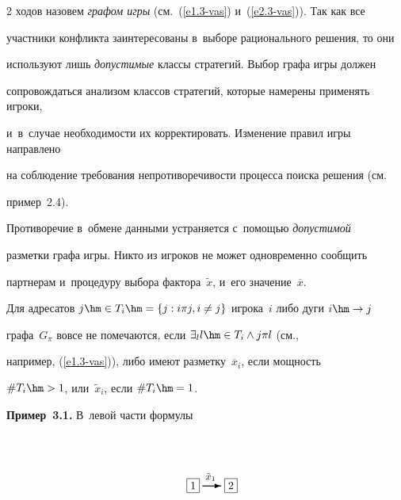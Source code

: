 \begin{multicols}{2}
ходов назовем \textit{графом игры} (см.~(\ref{e1.3-vas}) и~(\ref{e2.3-vas})). Так как все 

участники конфликта заинтересованы в~выборе рационального решения, то они 

используют лишь \textit{допустимые} клас\-сы стратегий. Выбор графа игры должен 

сопровождаться анализом клас\-сов стратегий, которые намерены применять игроки, 

и~в~случае не\-об\-хо\-ди\-мости их корректировать. Изменение правил игры направлено 

на соблюдение требования не\-про\-ти\-во\-ре\-чи\-вости процесса поиска решения (см.\

пример~2.4). 

    

    Противоречие в~обмене данными устраняется с~по\-мощью \textit{допустимой} 

разметки графа игры. Никто из игроков не может одновременно сообщить 

парт\-не\-рам и~процедуру выбора фактора~$\tilde{x}$, и~его значение~$\overline{x}$. 

Для адресатов $j\hm\in T_i \hm= \{j: i\pi j, i\not=j\}$ игрока~$i$ либо дуги $i\hm\to j$ 

графа~$G_\pi$ вовсе не помечаются, если $\exists_l l\hm\in T_i \wedge j\pi l$ (см., 

например, (\ref{e1.3-vas})), либо имеют раз\-мет\-ку~$\overline{x}_i$, если мощ\-ность 

$\# T_i\hm>1$, или~$\tilde{x}_i$, если $\# T_i\hm=1$. 

    

    \textbf{Пример~3.1.} В~левой час\-ти формулы

    

    \vspace*{-29pt}

    

    \noindent

      \begin{equation} 

\setlength{\unitlength}{1mm}\thicklines %

\begin{picture}(16,20)

\put(2,2.5){$\boxed{1}$}

\put(7,3.5){\vector(1,0){6}}

\put(14,2.5){$\boxed{2}$}

\put(8,5.5){\small{$\tilde{x}_1$}}


\end{picture}
\end{equation}
\end{multicols}

